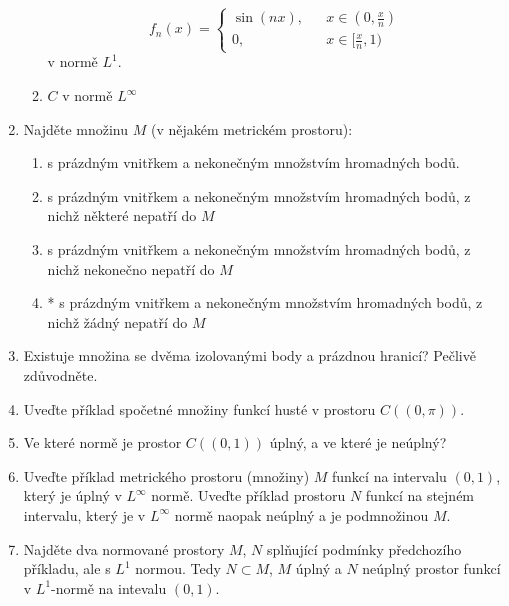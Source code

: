 \begin{enumerate}
\begin{enumerate}
                        \[ f_n(x)=\left\{\begin{aligned}
                                                \sin(nx), &&x\in(0,\frac x n)\\
                                                0,                &&x\in[\frac x n,1)                   
                                         \end{aligned}\right.\]
                         v normě $L^1$.
                \item $C$ v normě $L^\infty$
        \end{enumerate}
 \item Najděte množinu $M$ (v nějakém metrickém prostoru):
        \begin{enumerate}
                \item s prázdným vnitřkem a nekonečným množstvím hromadných bodů.
                \item s prázdným vnitřkem a nekonečným množstvím hromadných bodů, z nichž některé
                nepatří do $M$
                \item s prázdným vnitřkem a nekonečným množstvím hromadných bodů, z nichž nekonečno
                nepatří do $M$
                \item * s prázdným vnitřkem a nekonečným množstvím hromadných bodů, z nichž žádný
                nepatří do $M$
        \end{enumerate}
        \item Existuje množina se dvěma izolovanými body a prázdnou hranicí? Pečlivě zdůvodněte.
\item Uveďte příklad spočetné množiny funkcí husté v prostoru $C((0,\pi))$.
 \item Ve které normě je prostor $C((0,1))$ úplný, a ve které je neúplný?
 \item Uveďte příklad metrického prostoru (množiny) $M$ funkcí na intervalu $(0,1)$, který je úplný v
       $L^\infty$ normě. Uveďte příklad prostoru $N$ funkcí na stejném intervalu, který je v
       $L^\infty$ normě naopak neúplný a je podmnožinou $M$.
  \item Najděte dva normované prostory $M$, $N$ splňující podmínky předchozího příkladu, ale s $L^1$
                normou. Tedy $N\subset M$, $M$ úplný a $N$ neúplný prostor funkcí v $L^1$-normě
                na intevalu $(0,1)$.
\end{enumerate}

